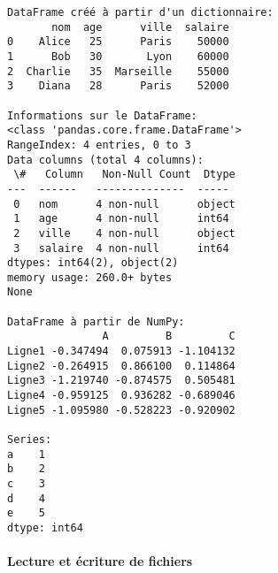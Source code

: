 \documentclass[11pt]{article}
\begin{document}
    \begin{Verbatim}[commandchars=\\\{\}]
DataFrame créé à partir d'un dictionnaire:
       nom  age      ville  salaire
0    Alice   25      Paris    50000
1      Bob   30       Lyon    60000
2  Charlie   35  Marseille    55000
3    Diana   28      Paris    52000

Informations sur le DataFrame:
<class 'pandas.core.frame.DataFrame'>
RangeIndex: 4 entries, 0 to 3
Data columns (total 4 columns):
 \#   Column   Non-Null Count  Dtype
---  ------   --------------  -----
 0   nom      4 non-null      object
 1   age      4 non-null      int64
 2   ville    4 non-null      object
 3   salaire  4 non-null      int64
dtypes: int64(2), object(2)
memory usage: 260.0+ bytes
None

DataFrame à partir de NumPy:
               A         B         C
Ligne1 -0.347494  0.075913 -1.104132
Ligne2 -0.264915  0.866100  0.114864
Ligne3 -1.219740 -0.874575  0.505481
Ligne4 -0.959125  0.936282 -0.689046
Ligne5 -1.095980 -0.528223 -0.920902

Series:
a    1
b    2
c    3
d    4
e    5
dtype: int64
    \end{Verbatim}

    \paragraph{Lecture et écriture de
fichiers}\label{lecture-et-uxe9criture-de-fichiers}
\end{document}
